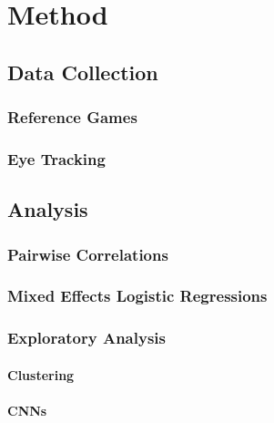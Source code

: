 ﻿\chapter{Method}

\section{Data Collection}
\label{sec:data}

\subsection{Reference Games}
\label{sec:data:ref_games}

\subsection{Eye Tracking}
\label{sec:data:eyetr}

\section{Analysis}
\label{sec:analysis}

\subsection{Pairwise Correlations}
\label{sec:analysis:corr}

\subsection{Mixed Effects Logistic Regressions}
\label{sec:analysis:mixed_effects}

\subsection{Exploratory Analysis}
\label{sec:analysis:exploratory}

\subsubsection{Clustering}
\label{sec:analysis:exploratory:clustering}

\subsubsection{CNNs}
\label{sec:analysis:exploratory:cnn}
